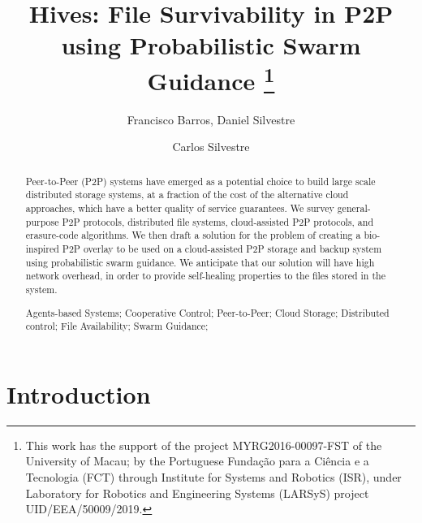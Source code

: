 \documentclass[runningheads]{llncs}
\begin{document}
\title {Hives: File Survivability in P2P using Probabilistic Swarm Guidance
\thanks{This work has the support of the project MYRG2016-00097-FST of the University of Macau; by the Portuguese Fundação para a Ciência e a Tecnologia (FCT) through Institute for Systems and Robotics (ISR), under Laboratory for Robotics and Engineering Systems (LARSyS) project UID/EEA/50009/2019.}
}
\author{Francisco Barros, Daniel Silvestre \and Carlos Silvestre}
\maketitle
\begin{abstract}
Peer-to-Peer (P2P) systems have emerged as a potential choice to build large scale distributed storage systems, at a fraction of the cost of the alternative cloud approaches, which have a better quality of service guarantees. We survey general-purpose P2P protocols, distributed file systems, cloud-assisted P2P protocols, and erasure-code algorithms. We then draft a solution for the problem of creating a bio-inspired P2P overlay to be used on a cloud-assisted P2P storage and backup system using probabilistic swarm guidance. We anticipate that our solution will have high network overhead, in order to provide self-healing properties to the files stored in the system.

\begin{keywords}Agents-based Systems; Cooperative Control; Peer-to-Peer; Cloud Storage; Distributed control; File Availability; Swarm Guidance;\end{keywords}
\end{abstract}

\setcounter{tocdepth}{3}
\tableofcontents

\newpage\section{Introduction}\label{sec:intro}
\end{document}
